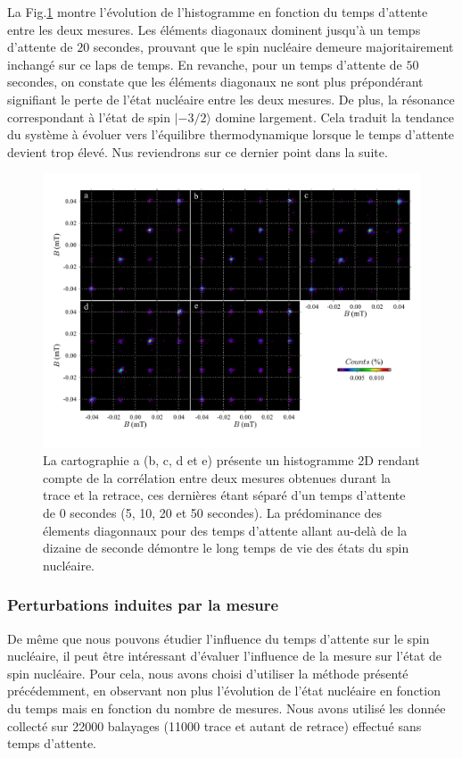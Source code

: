 La Fig.\ref{evolution_temps} montre l'évolution de l'histogramme en fonction du temps d'attente entre les deux mesures. Les éléments diagonaux dominent jusqu'à un temps d'attente de $20$ secondes, prouvant que le spin nucléaire demeure majoritairement inchangé sur ce laps de temps. En revanche, pour un temps d'attente de $50$ secondes, on constate que les éléments diagonaux ne sont plus prépondérant signifiant le perte de l'état nucléaire entre les deux mesures. De plus, la résonance correspondant à l'état de spin $|-3/2 \rangle$ domine largement. Cela traduit la tendance du système à évoluer vers l'équilibre thermodynamique lorsque le temps d'attente devient trop élevé. Nus reviendrons sur ce dernier point dans la suite.

\begin{figure}[h]
\includegraphics[scale=0.45]{Resultats/HistTime/HistTime.pdf} 
\caption{La cartographie a (b, c, d et e) présente un histogramme 2D rendant compte de la corrélation entre deux mesures obtenues durant la trace et la retrace, ces dernières étant séparé d'un temps d'attente de 0 secondes (5, 10, 20 et 50 secondes). La prédominance des élements diagonnaux pour des temps d'attente allant au-delà de la dizaine de seconde démontre le long temps de vie des états du spin nucléaire.}
\label{evolution_temps}
\end{figure}

\subsubsection{Perturbations induites par la mesure}
De m\^eme que nous pouvons étudier l'influence du temps d'attente sur le spin nucléaire, il peut \^etre intéressant d'évaluer l'influence de la mesure sur l'état de spin nucléaire. Pour cela, nous avons choisi d'utiliser la méthode présenté précédemment, en observant non plus l'évolution de l'état nucléaire en fonction du temps mais en fonction du nombre de mesures. Nous avons utilisé les donnée collecté sur 22000 balayages (11000 trace et autant de retrace) effectué sans temps d'attente.

